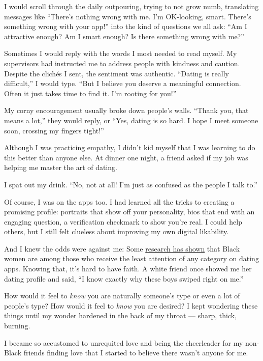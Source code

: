 I would scroll through the daily outpouring, trying to not grow numb,
translating messages like ``There's nothing wrong with me. I'm
OK-looking, smart. There's something wrong with your app!'' into the
kind of questions we all ask: ``Am I attractive enough? Am I smart
enough? Is there something wrong with me?''

Sometimes I would reply with the words I most needed to read myself. My
supervisors had instructed me to address people with kindness and
caution. Despite the clichés I sent, the sentiment was authentic.
``Dating is really difficult,'' I would type. ``But I believe you
deserve a meaningful connection. Often it just takes time to find it.
I'm rooting for you!''

My corny encouragement usually broke down people's walls. ``Thank you,
that means a lot,'' they would reply, or ``Yes, dating is so hard. I
hope I meet someone soon, crossing my fingers tight!''

Although I was practicing empathy, I didn't kid myself that I was
learning to do this better than anyone else. At dinner one night, a
friend asked if my job was helping me master the art of dating.

I spat out my drink. ``No, not at all! I'm just as confused as the
people I talk to.''

Of course, I was on the apps too. I had learned all the tricks to
creating a promising profile: portraits that show off your personality,
bios that end with an engaging question, a verification checkmark to
show you're real. I could help others, but I still felt clueless about
improving my own digital likability.

And I knew the odds were against me: Some
\href{http://www.karen-levy.net/wp-content/uploads/2018/09/Debiasing_Desire_published.pdf}{research
has shown} that Black women are among those who receive the least
attention of any category on dating apps. Knowing that, it's hard to
have faith. A white friend once showed me her dating profile and said,
``I know exactly why these boys swiped right on me.''

How would it feel to \emph{know} you are naturally someone's type or
even a lot of people's type? How would it feel to \emph{know} you are
desired? I kept wondering these things until my wonder hardened in the
back of my throat --- sharp, thick, burning.

I became so accustomed to unrequited love and being the cheerleader for
my non-Black friends finding love that I started to believe there wasn't
anyone for me.

